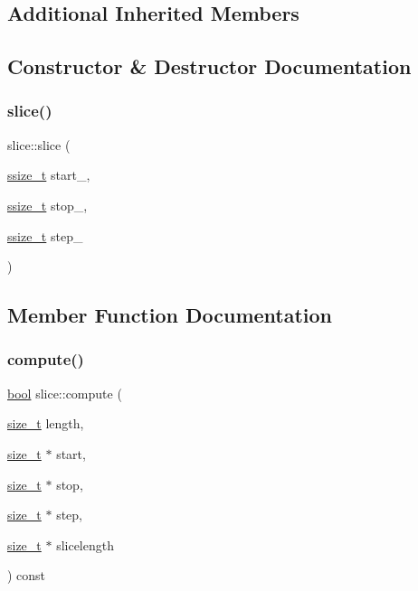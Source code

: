 \subsection*{Additional Inherited Members}


\subsection{Constructor \& Destructor Documentation}
\mbox{\label{classslice_a4caff82ebcad8f35458f8519aa0a9f77}} 
\subsubsection{\texorpdfstring{slice()}{slice()}}
{\footnotesize\ttfamily slice\+::slice (\begin{DoxyParamCaption}\item[{\mbox{\hyperlink{detail_2common_8h_ac430d16fc097b3bf0a7469cfd09decda}{ssize\+\_\+t}}}]{start\+\_\+,  }\item[{\mbox{\hyperlink{detail_2common_8h_ac430d16fc097b3bf0a7469cfd09decda}{ssize\+\_\+t}}}]{stop\+\_\+,  }\item[{\mbox{\hyperlink{detail_2common_8h_ac430d16fc097b3bf0a7469cfd09decda}{ssize\+\_\+t}}}]{step\+\_\+ }\end{DoxyParamCaption})\hspace{0.3cm}{\ttfamily [inline]}}



\subsection{Member Function Documentation}
\mbox{\label{classslice_ab45c9007278b27dcc5bacc3eb38be926}} 
\subsubsection{\texorpdfstring{compute()}{compute()}}
{\footnotesize\ttfamily \mbox{\hyperlink{asdl_8h_af6a258d8f3ee5206d682d799316314b1}{bool}} slice\+::compute (\begin{DoxyParamCaption}\item[{\mbox{\hyperlink{detail_2common_8h_a801d6a451a01953ef8cbae6feb6a3638}{size\+\_\+t}}}]{length,  }\item[{\mbox{\hyperlink{detail_2common_8h_a801d6a451a01953ef8cbae6feb6a3638}{size\+\_\+t}} $\ast$}]{start,  }\item[{\mbox{\hyperlink{detail_2common_8h_a801d6a451a01953ef8cbae6feb6a3638}{size\+\_\+t}} $\ast$}]{stop,  }\item[{\mbox{\hyperlink{detail_2common_8h_a801d6a451a01953ef8cbae6feb6a3638}{size\+\_\+t}} $\ast$}]{step,  }\item[{\mbox{\hyperlink{detail_2common_8h_a801d6a451a01953ef8cbae6feb6a3638}{size\+\_\+t}} $\ast$}]{slicelength }\end{DoxyParamCaption}) const\hspace{0.3cm}{\ttfamily [inline]}}




